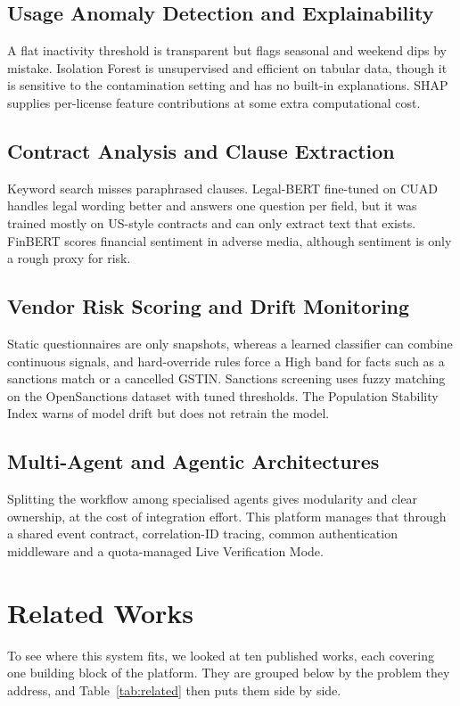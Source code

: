 \subsection{Usage Anomaly Detection and Explainability}
A flat inactivity threshold is transparent but flags seasonal and weekend dips by mistake. Isolation Forest is unsupervised and efficient on tabular data, though it is sensitive to the contamination setting and has no built-in explanations. SHAP supplies per-license feature contributions at some extra computational cost.

\subsection{Contract Analysis and Clause Extraction}
Keyword search misses paraphrased clauses. Legal-BERT fine-tuned on CUAD handles legal wording better and answers one question per field, but it was trained mostly on US-style contracts and can only extract text that exists. FinBERT scores financial sentiment in adverse media, although sentiment is only a rough proxy for risk.

\subsection{Vendor Risk Scoring and Drift Monitoring}
Static questionnaires are only snapshots, whereas a learned classifier can combine continuous signals, and hard-override rules force a High band for facts such as a sanctions match or a cancelled GSTIN. Sanctions screening uses fuzzy matching on the OpenSanctions dataset with tuned thresholds. The Population Stability Index warns of model drift but does not retrain the model.

\subsection{Multi-Agent and Agentic Architectures}
Splitting the workflow among specialised agents gives modularity and clear ownership, at the cost of integration effort. This platform manages that through a shared event contract, correlation-ID tracing, common authentication middleware and a quota-managed Live Verification Mode.

\section{Related Works}

To see where this system fits, we looked at ten published works, each covering one building block of the platform. They are grouped below by the problem they address, and Table~\ref{tab:related} then puts them side by side.

